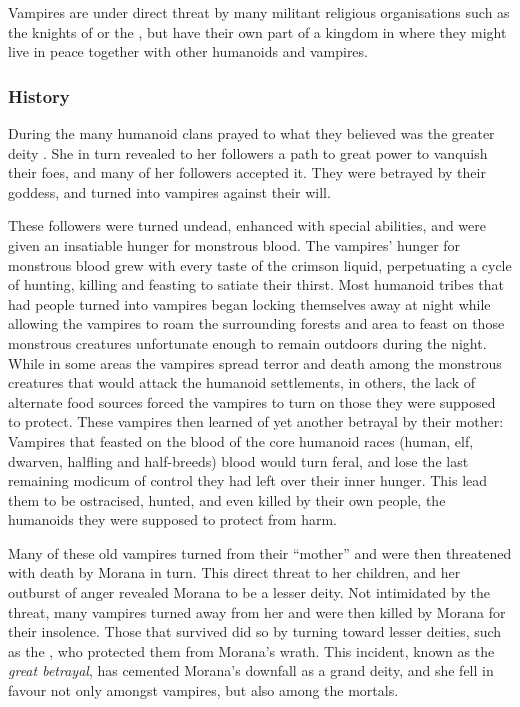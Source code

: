 Vampires are under direct threat by many militant religious organisations such
as the knights of  or the , but have
their own part of a kingdom in  where they might live
in peace together with other humanoids and vampires.

\subsubsection{History}

During the  many humanoid clans prayed to what
they believed was the greater deity . She in turn revealed
to her followers a path to great power to vanquish their foes, and many of her
followers accepted it. They were betrayed by their goddess, and turned into
vampires against their will.

These followers were turned undead, enhanced with special abilities, and were
given an insatiable hunger for monstrous blood. The vampires' hunger for
monstrous blood grew with every taste of the crimson liquid, perpetuating a
cycle of hunting, killing and feasting to satiate their thirst. Most humanoid
tribes that had people turned into vampires began locking themselves away at
night while allowing the vampires to roam the surrounding forests and area to
feast on those monstrous creatures unfortunate enough to remain outdoors
during the night. While in some areas the vampires spread terror and death
among the monstrous creatures that would attack the humanoid settlements, in
others, the lack of alternate food sources forced the vampires to turn on
those they were supposed to protect. These vampires then learned of yet
another betrayal by their mother: Vampires that feasted on the blood of the
core humanoid races (human, elf, dwarven, halfling and half-breeds) blood
would turn feral, and lose the last remaining modicum of control they had left
over their inner hunger. This lead them to be ostracised, hunted, and even
killed by their own people, the humanoids they were supposed to protect from
harm.

Many of these old vampires turned from their ``mother'' and were then
threatened with death by Morana in turn. This direct threat to her children,
and her outburst of anger revealed Morana to be a lesser deity. Not
intimidated by the threat, many vampires turned away from her and were then
killed by Morana for their insolence. Those that survived did so by turning
toward lesser deities, such as the , who protected
them from Morana's wrath. This incident, known as the \emph{great betrayal},
has cemented Morana's downfall as a grand deity, and she fell in favour not
only amongst vampires, but also among the mortals.

